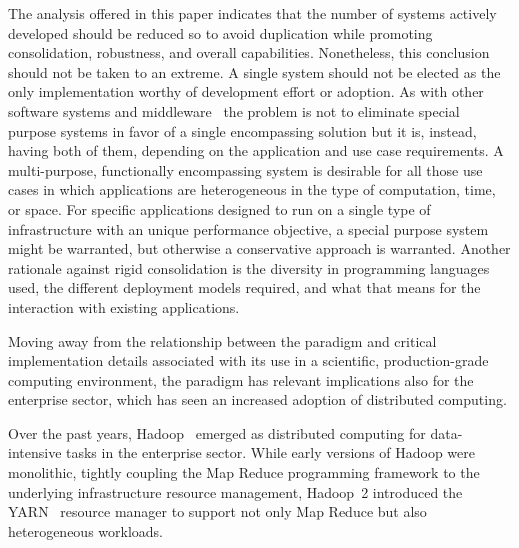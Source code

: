 \documentclass{sig-alternate}
\begin{document}
The analysis offered in this paper indicates that the number of \pilot systems
actively developed should be reduced so to avoid duplication while promoting
consolidation, robustness, and overall capabilities. Nonetheless, this
conclusion should not be taken to an extreme. A single \pilot system should not
be elected as the only implementation worthy of development effort or
adoption. As with other software systems and middleware~\cite{bernstein1996} the
problem is not to eliminate special purpose systems in favor of a single
encompassing solution but it is, instead, having both of them, depending on the
application and use case requirements. A multi-purpose, functionally
encompassing \pilot system is desirable for all those use cases in which
applications are heterogeneous in the type of computation, time, or space. For
specific applications designed to run on a single type of infrastructure with an
unique performance objective, a special purpose system might be warranted, but
otherwise a conservative approach is warranted.  Another rationale against rigid
consolidation is the diversity in programming languages used, the different
deployment models required, and what that means for the interaction with
existing applications.


 Moving away from the
relationship between the \pilot paradigm and critical implementation details
associated with its use in a scientific, production-grade computing environment,
the \pilot paradigm has relevant implications also for the enterprise sector,
which has seen an increased adoption of distributed computing.

Over the past years, Hadoop~\cite{hadoop} emerged as distributed computing for
data-intensive tasks in the enterprise sector. While early versions of Hadoop
were monolithic, tightly coupling the Map Reduce programming framework to the
underlying infrastructure resource management, Hadoop~2 introduced the
YARN~\cite{yarn-paper} resource manager to support not only Map Reduce but also
heterogeneous workloads.
\end{document}
